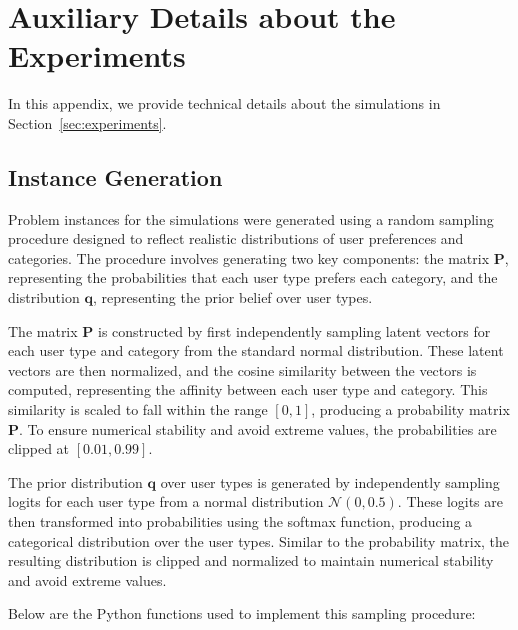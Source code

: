 \section{Auxiliary Details about the Experiments}
\label{sec:auxiliary-details-about-the-experiments}

In this appendix, we provide technical details about the simulations in Section~\ref{sec:experiments}.

\subsection{Instance Generation}

Problem instances for the simulations were generated using a random sampling procedure designed to reflect realistic distributions of user preferences and categories. The procedure involves generating two key components: the matrix $\bm{P}$, representing the probabilities that each user type prefers each category, and the distribution $\bm{q}$, representing the prior belief over user types.

The matrix $\bm{P}$ is constructed by first independently sampling latent vectors for each user type and category from the standard normal distribution. These latent vectors are then normalized, and the cosine similarity between the vectors is computed, representing the affinity between each user type and category. This similarity is scaled to fall within the range $[0, 1]$, producing a probability matrix $\bm{P}$. To ensure numerical stability and avoid extreme values, the probabilities are clipped at $[0.01, 0.99]$.

The prior distribution $\bm{q}$ over user types is generated by independently sampling logits for each user type from a normal distribution $\mathcal{N}(0, 0.5)$. These logits are then transformed into probabilities using the softmax function, producing a categorical distribution over the user types. Similar to the probability matrix, the resulting distribution is clipped and normalized to maintain numerical stability and avoid extreme values.

Below are the Python functions used to implement this sampling procedure:

